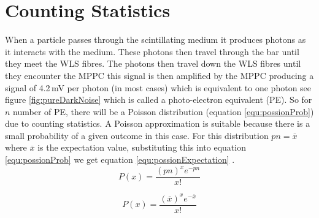 
\section{Counting Statistics} \label{sec:GEANT4Simulation_countingStats}
When a particle passes through the scintillating medium it produces photons as it interacts with the medium. These photons then travel through the bar until they meet the WLS fibres. The photons then travel down the WLS fibres until they encounter the MPPC  this signal is then amplified by the MPPC producing a signal of 4.2\,mV per photon (in most cases) which is equivalent to one photon see figure \ref{fig:pureDarkNoise} which is called a photo-electron equivalent (PE). So for $n$ number of PE, there will be a Poisson distribution (equation \ref{equ:possionProb}) due to counting statistics. A Poisson approximation is suitable because there is a small probability of a given outcome in this case. For this distribution $pn = \overline{x}$ where $\overline{x}$ is the expectation value, substituting this into equation \ref{equ:possionProb} we get equation \ref{equ:possionExpectation} \cite{knoll_2010}.
\begin{equation}
P(x) = \frac{(pn)^x e^{-pn}}{x!}  
\label{equ:possionProb}
\end{equation}

\begin{equation}
P(x) = \frac{(\overline{x})^x e^{-\overline{x}}}{x!}  
\label{equ:possionExpectation}
\end{equation}

